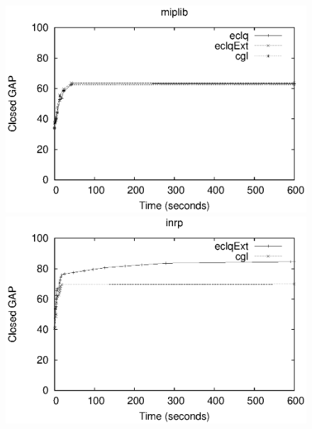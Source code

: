 \documentclass{endm}
\begin{document}
\begin{figure}	
	\begin{minipage}[h]{.5\textwidth}
		\begin{center}
			\includegraphics[width=1.\textwidth]{miplib.eps}
		\end{center}
	\end{minipage}
	\begin{minipage}[h]{.5\textwidth}
		\begin{center}
			\includegraphics[width=1.\textwidth]{nurse.eps}
		\end{center}
	\end{minipage}
	\begin{minipage}[h]{.5\textwidth}
		\begin{center}

\end{center}
\end{minipage}
\end{figure}
\end{document}
